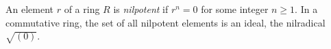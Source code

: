 
An element $r$ of a ring $R$ is \emph{nilpotent} if $r^n=0$ for some integer $n\ge1$. In a commutative ring, the set of all nilpotent elements is an ideal, the nilradical $\sqrt{(0)}$.
